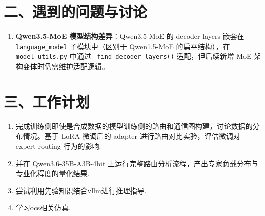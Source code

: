 \documentclass{sjtuweekly}
\begin{document}
\section{二、遇到的问题与讨论}

\begin{enumerate}
  
  \item \textbf{Qwen3.5-MoE 模型结构差异}：Qwen3.5-MoE 的 decoder layers 嵌套在 \texttt{language\_model} 子模块中（区别于 Qwen1.5-MoE 的扁平结构），在 \texttt{model\_utils.py} 中通过 \texttt{\_find\_decoder\_layers()} 适配，但后续新增 MoE 架构变体时仍需维护适配逻辑。
\end{enumerate}

\section{三、工作计划}

\begin{enumerate}
  \item 完成训练侧即使是合成数据的模型训练侧的路由和通信图构建，讨论数据的分布情况。基于 LoRA 微调后的 adapter 进行路由对比实验，评估微调对 expert routing 行为的影响.
  \item 并在 Qwen3.6-35B-A3B-4bit 上运行完整路由分析流程，产出专家负载分布与专业化程度的量化结果.
  \item 尝试利用先验知识结合vllm进行推理指导.
  \item 学习ocs相关仿真.
\end{enumerate}

\printbib
\end{document}
